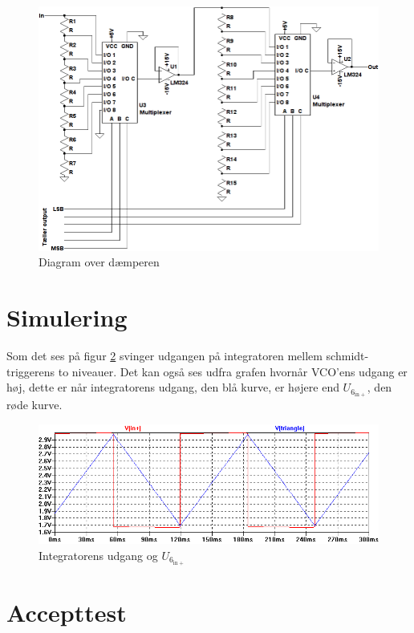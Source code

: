\begin{figure}[h]
\centering
\includegraphics[width=\textwidth]{teknisk/volumenkontrol/daemper.png}
\caption{Diagram over dæmperen}
\label{fig:volumenkontrol_daemper}
\end{figure}

\section{Simulering}
\label{volumenkontrol-simulering}

Som det ses på figur \ref{fig:vco-signal} svinger udgangen på integratoren mellem schmidt-triggerens to niveauer. Det kan også ses udfra grafen hvornår VCO'ens udgang er høj, dette er når integratorens udgang, den blå kurve, er højere end $U_{6_{\mathrm{in+}}}$, den røde kurve.

\begin{figure}[h]
\centering
\includegraphics[width=\textwidth]{teknisk/volumenkontrol/vco-signal.png}
\caption{Integratorens udgang og $U_{6_{\mathrm{in+}}}$}
\label{fig:vco-signal}
\end{figure}


\section{Accepttest}
\label{volumenkontrol-accepttest}

